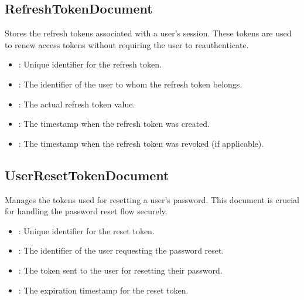 \documentclass[letterpaper,10pt,english]{sphinxmanual}
\begin{document}
\subsection{RefreshTokenDocument}
\label{\detokenize{crm_system/authorization_service:refreshtokendocument}}
\sphinxAtStartPar
Stores the refresh tokens associated with a user’s session. These tokens are used to renew access tokens without requiring the user to re\sphinxhyphen{}authenticate.
\begin{itemize}
\item {} 
\sphinxAtStartPar
{}: 
\sphinxhyphen{} Unique identifier for the refresh token.

\item {} 
\sphinxAtStartPar
{}: 
\sphinxhyphen{} The identifier of the user to whom the refresh token belongs.

\item {} 
\sphinxAtStartPar
{}: 
\sphinxhyphen{} The actual refresh token value.

\item {} 
\sphinxAtStartPar
{}: 
\sphinxhyphen{} The timestamp when the refresh token was created.

\item {} 
\sphinxAtStartPar
{}: 
\sphinxhyphen{} The timestamp when the refresh token was revoked (if applicable).

\end{itemize}


\subsection{UserResetTokenDocument}
\label{\detokenize{crm_system/authorization_service:userresettokendocument}}
\sphinxAtStartPar
Manages the tokens used for resetting a user’s password. This document is crucial for handling the password reset flow securely.
\begin{itemize}
\item {} 
\sphinxAtStartPar
{}: 
\sphinxhyphen{} Unique identifier for the reset token.

\item {} 
\sphinxAtStartPar
{}: 
\sphinxhyphen{} The identifier of the user requesting the password reset.

\item {} 
\sphinxAtStartPar
{}: 
\sphinxhyphen{} The token sent to the user for resetting their password.

\item {} 
\sphinxAtStartPar
{}: 
\sphinxhyphen{} The expiration timestamp for the reset token.

\end{itemize}
\end{document}
